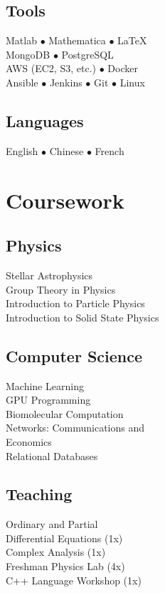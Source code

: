 \documentclass[]{yubo-resume-openfont}
\begin{document}
\begin{minipage}[t]{0.33\textwidth}
    \subsection{Tools}
    Matlab $\bullet$ Mathematica $\bullet$ \LaTeX\\
    MongoDB $\bullet$ PostgreSQL \\
    AWS (EC2, S3, etc.) $\bullet$ Docker\\
    Ansible $\bullet$ Jenkins $\bullet$ Git $\bullet$ Linux\\
    \sectionsep
    \subsection{Languages}
    English $\bullet$ Chinese $\bullet$ French
    \sectionsep




\section{Coursework}
    \subsection{Physics}
        Stellar Astrophysics\\
        Group Theory in Physics\\
        Introduction to Particle Physics\\
        Introduction to Solid State Physics\\
    \sectionsep

    \subsection{Computer Science}
        Machine Learning\\
        GPU Programming\\
        Biomolecular Computation\\
        Networks: Communications and\\
            \tab Economics\\
        Relational Databases
    \sectionsep

    \subsection{Teaching}
        Ordinary and Partial\\
            \tab Differential Equations (1x)\\
        Complex Analysis (1x)\\
        Freshman Physics Lab (4x)\\
        C++ Language Workshop (1x)
    \sectionsep

%
%

\end{minipage}
\end{document}
